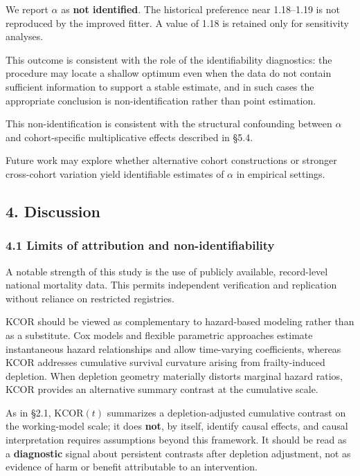 \documentclass[
]{article}
\begin{document}
We report \(\alpha\) as \textbf{not identified}. The historical preference near 1.18--1.19 is not reproduced by the improved fitter. A value of 1.18 is retained only for sensitivity analyses.

This outcome is consistent with the role of the identifiability diagnostics: the procedure may locate a shallow optimum even when the data do not contain sufficient information to support a stable estimate, and in such cases the appropriate conclusion is non-identification rather than point estimation.

This non-identification is consistent with the structural confounding between \(\alpha\) and cohort-specific multiplicative effects described in §5.4.

Future work may explore whether alternative cohort constructions or stronger cross-cohort variation yield identifiable estimates of \(\alpha\) in empirical settings.

\subsection{4. Discussion}\label{discussion}

\subsubsection{4.1 Limits of attribution and non-identifiability}\label{limits-of-attribution-and-non-identifiability}

A notable strength of this study is the use of publicly available, record-level national mortality data. This permits independent verification and replication without reliance on restricted registries.

KCOR should be viewed as complementary to hazard-based modeling rather than as a substitute. Cox models and flexible parametric approaches estimate instantaneous hazard relationships and allow time-varying coefficients, whereas KCOR addresses cumulative survival curvature arising from frailty-induced depletion. When depletion geometry materially distorts marginal hazard ratios, KCOR provides an alternative summary contrast at the cumulative scale.

As in §2.1, \(\mathrm{KCOR}(t)\) summarizes a depletion-adjusted cumulative contrast on the working-model scale; it does \textbf{not}, by itself, identify causal effects, and causal interpretation requires assumptions beyond this framework. It should be read as a \textbf{diagnostic} signal about persistent contrasts after depletion adjustment, not as evidence of harm or benefit attributable to an intervention.
\end{document}
